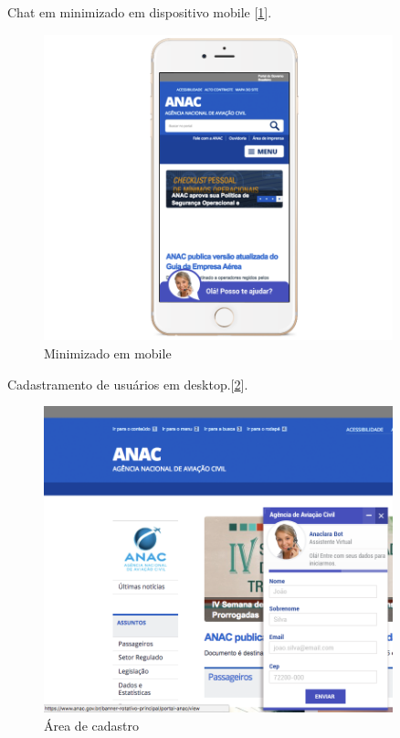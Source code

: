 
\par Chat em minimizado em dispositivo mobile [\ref{fig:min_iphone}].
\begin{figure}[!ht]
  \centering
      \includegraphics[width=0.9\textwidth]{front_chat_iphone_min}
  \caption{Minimizado em mobile}
  \label{fig:min_iphone}
\end{figure}

\newpage

\par Cadastramento de usuários em desktop.[\ref{fig:anac_cad}].
\begin{figure}[!ht]
  \centering
      \includegraphics[width=0.9\textwidth]{no_site_anac_cad}
  \caption{Área de cadastro}
  \label{fig:anac_cad}
\end{figure}

